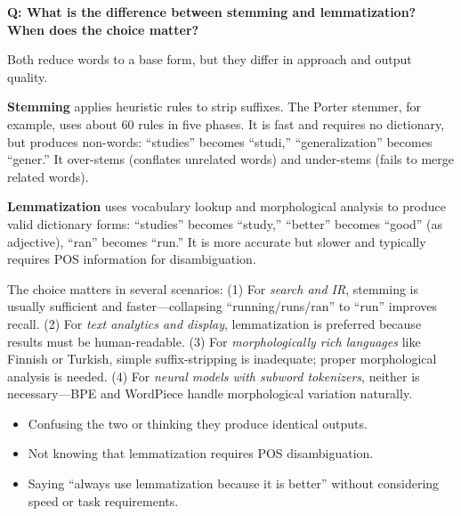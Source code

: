 \begin{interviewq}
\end{interviewq}

\vspace{0.5em}

\begin{interviewq}
\textbf{Q: What is the difference between stemming and lemmatization? When does the choice matter?}

 \quad {} \quad \badgefreq{\freqmed}

\stronganswer
Both reduce words to a base form, but they differ in approach and output quality.

\textbf{Stemming} applies heuristic rules to strip suffixes. The Porter stemmer, for
example, uses about 60 rules in five phases. It is fast and requires no dictionary, but
produces non-words: ``studies'' becomes ``studi,'' ``generalization'' becomes ``gener.''
It over-stems (conflates unrelated words) and under-stems (fails to merge related words).

\textbf{Lemmatization} uses vocabulary lookup and morphological analysis to produce valid
dictionary forms: ``studies'' becomes ``study,'' ``better'' becomes ``good'' (as adjective),
``ran'' becomes ``run.'' It is more accurate but slower and typically requires POS
information for disambiguation.

The choice matters in several scenarios: (1) For \emph{search and IR}, stemming is usually
sufficient and faster---collapsing ``running/runs/ran'' to ``run'' improves recall. (2) For
\emph{text analytics and display}, lemmatization is preferred because results must be
human-readable. (3) For \emph{morphologically rich languages} like Finnish or Turkish, simple
suffix-stripping is inadequate; proper morphological analysis is needed. (4) For
\emph{neural models with subword tokenizers}, neither is necessary---BPE and WordPiece
handle morphological variation naturally.

\redflags
\begin{itemize}
    \item Confusing the two or thinking they produce identical outputs.
    \item Not knowing that lemmatization requires POS disambiguation.
    \item Saying ``always use lemmatization because it is better'' without considering speed
    or task requirements.
\end{itemize}


\end{interviewq}
